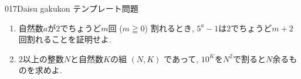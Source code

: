 \begin{prob}{017}{}{Daisu gakukon テンプレート問題}
\begin{enumerate}
    \item 自然数$a$が$2$でちょうど$m$回 ($m\geqq 0$) 割れるとき, $5^a-1$は$2$でちょうど$m+2$回割れることを証明せよ.
    \item $2$以上の整数$N$と自然数$K$の組 $(N,K)$ であって, $10^K$を$N^2$で割ると$N$余るものを求めよ.
\end{enumerate}
\end{prob}
